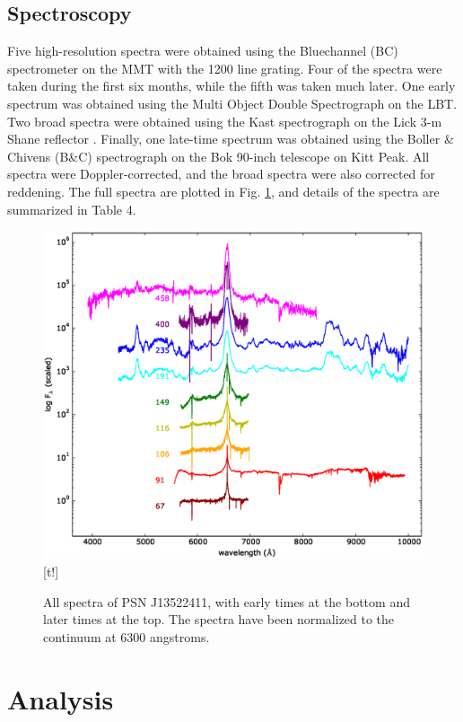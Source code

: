\documentclass[iop]{emulateapj}
\begin{document}
\subsection{Spectroscopy} \label{obs:spec}
Five high-resolution spectra were obtained using the Bluechannel (BC) spectrometer on the MMT with the 1200 line grating. Four of the spectra were taken during the first six months, while the fifth was taken much later. One early spectrum was obtained using the Multi Object Double Spectrograph \citep[MODS]{Bya00} on the LBT. Two broad spectra were obtained using the Kast spectrograph on the Lick 3-m Shane reflector \citep{Mil93}. Finally, one late-time spectrum was obtained using the Boller \& Chivens (B\&C) spectrograph on the Bok 90-inch telescope on Kitt Peak. All spectra were Doppler-corrected, and the broad spectra were also corrected for reddening. The full spectra are plotted in Fig. \ref{fig:full}, and details of the spectra are summarized in Table 4.

\begin{figure}
  \centering
  \includegraphics[width=18cm]{graphics/full.eps}[t!]
  \caption{All spectra of PSN J13522411, with early times at the bottom and later times at the top. The spectra have been normalized to the continuum at 6300 angstroms.}
  \label{fig:full}
\end{figure}

\section{Analysis} \label{analysis}
\end{document}
